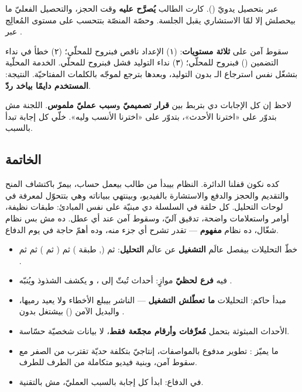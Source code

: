 \begin{qa}
عبر  بتحصيل يدويّ (). كارت الطالب
\textbf{يُصرَّح عليه} وقت الحجز، والتحصيل الفعليّ ما بيحصلش إلا لمّا الاستشاري يقبل
الجلسة. وحصّة المنصّة بتتحسب على مستوى المُعالِج عبر .
\end{qa}

\begin{qa}
سقوط آمن على \textbf{ثلاثة مستويات}: (١) الإعداد ناقص فبنروح للمحلّي؛ (٢) خطأ
 في نداء التضمين () فبنروح للمحلّي؛ (٣) نداء التوليد فشل
فبنروح للمحلّي. الخدمة المحلّية  بتشغّل نفس استرجاع
الـ بدون التوليد، وبعدها بترجع لموجّه بالكلمات المفتاحيّة. النتيجة:
\textbf{المستخدم دايمًا بياخد ردّ}.
\end{qa}

\begin{note}
لاحظ إن كل الإجابات دي بتربط بين \textbf{قرار تصميميّ} و\textbf{سبب عمليّ ملموس}.
اللجنة مش بتدوّر على «اخترنا الأحدث»، بتدوّر على «اخترنا الأنسب وليه». خلّي كل
إجابة تبدأ بالسبب.
\end{note}

\subsection{الخاتمة}

كده نكون قفلنا الدائرة. النظام بيبدأ من طالب بيعمل حساب، بيمرّ باكتشاف المنح
والتقديم والحجز والدفع والاستشارة بالفيديو، وبينتهي ببياناته وهي بتتحوّل لمعرفة في
لوحات التحليل. كل حلقة في السلسلة دي مبنيّة على نفس المبادئ: طبقات نظيفة، أوامر
واستعلامات واضحة، تدقيق آليّ، وسقوط آمن عند أي عطل. ده مش بس نظام شغّال، ده نظام
\textbf{مفهوم} — تقدر تشرح أي جزء منه، وده أهمّ حاجة في يوم الدفاع.

\begin{summary}
\begin{itemize}
  \item خطّ التحليلات بيفصل عالَم \textbf{التشغيل} عن عالَم \textbf{التحليل}:
     ثم  (, طبقة ) ثم 
    ( ثم  ) ثم  ثم .
  \item فيه \textbf{فرع لحظيّ} موازٍ: أحداث تُبثّ إلى ، و يكشف الشذوذ ويُنبّه .
  \item مبدأ حاكم: التحليلات \textbf{ما تعطّلش التشغيل} — الناشر بيبلع الأخطاء
    ولا يعيد رميها، والبديل الآمن () بيشتغل بدون .
  \item الأحداث المبثوثة بتحمل \textbf{مُعرِّفات وأرقام مجمّعة فقط}، لا بيانات
    شخصيّة حسّاسة.
  \item ما يميّز : تطوير مدفوع بالمواصفات،  إنتاجيّ بتكلفة
    حديّة تقترب من الصفر مع سقوط آمن، وبنية فيديو متكاملة من الطرف للطرف.
  \item في الدفاع: ابدأ كل إجابة بالسبب العمليّ، مش بالتقنية.
\end{itemize}
\end{summary}
